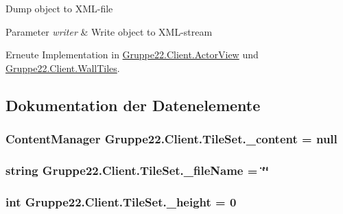 Dump object to X\-M\-L-\/file 


\begin{DoxyParams}{Parameter}
{\em writer} & Write object to X\-M\-L-\/stream\\
\hline
\end{DoxyParams}


Erneute Implementation in \hyperlink{class_gruppe22_1_1_client_1_1_actor_view_af04d89d3988da620d7b092055f64b37b}{Gruppe22.\-Client.\-Actor\-View} und \hyperlink{class_gruppe22_1_1_client_1_1_wall_tiles_a1298b94da55c6c2d82306396bef59cb1}{Gruppe22.\-Client.\-Wall\-Tiles}.



\subsection{Dokumentation der Datenelemente}
\hypertarget{class_gruppe22_1_1_client_1_1_tile_set_af9c1d1df067b48ed6701e75295377044}{
\subsubsection[{\-\_\-content}]{\setlength{\rightskip}{0pt plus 5cm}Content\-Manager Gruppe22.\-Client.\-Tile\-Set.\-\_\-content = null\hspace{0.3cm}{\ttfamily [protected]}}}\label{class_gruppe22_1_1_client_1_1_tile_set_af9c1d1df067b48ed6701e75295377044}
\hypertarget{class_gruppe22_1_1_client_1_1_tile_set_a8dcf979a6db589877617e61d8cf83c00}{
\subsubsection[{\-\_\-file\-Name}]{\setlength{\rightskip}{0pt plus 5cm}string Gruppe22.\-Client.\-Tile\-Set.\-\_\-file\-Name = \char`\"{}\char`\"{}\hspace{0.3cm}{\ttfamily [protected]}}}\label{class_gruppe22_1_1_client_1_1_tile_set_a8dcf979a6db589877617e61d8cf83c00}
\hypertarget{class_gruppe22_1_1_client_1_1_tile_set_aa46be5438fd81b9c53c872896a841ef8}{
\subsubsection[{\-\_\-height}]{\setlength{\rightskip}{0pt plus 5cm}int Gruppe22.\-Client.\-Tile\-Set.\-\_\-height = 0\hspace{0.3cm}{\ttfamily [protected]}}}\label{class_gruppe22_1_1_client_1_1_tile_set_aa46be5438fd81b9c53c872896a841ef8}
